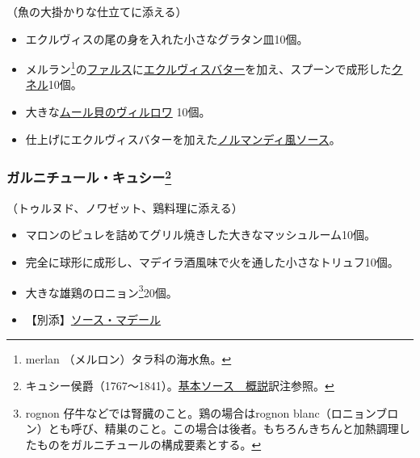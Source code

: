 \begin{recette}
（魚の大掛かりな仕立てに添える）

\begin{itemize}
\item
  エクルヴィスの尾の身を入れた小さなグラタン皿10個。
\item
  メルラン\footnote{merlan （メルロン）タラ科の海水魚。}の\protect\hyperlink{farce-a}{ファルス}に\protect\hyperlink{beurre-d-ecrevissse}{エクルヴィスバター}を加え、スプーンで成形した\protect\hyperlink{quenelles}{クネル}10個。
\item
  大きな\protect\hyperlink{moules-villeroy}{ムール貝のヴィルロワ} 10個。
\item
  仕上げにエクルヴィスバターを加えた\protect\hyperlink{sauce-normande}{ノルマンディ風ソース}。
\end{itemize}

\atoaki{}

\hypertarget{garniture-cussy}{%
\subsubsection[ガルニチュール・キュシー]{\texorpdfstring{ガルニチュール・キュシー\footnote{キュシー侯爵（1767〜1841）。\protect\hyperlink{osbservation-sur-la-sauce}{基本ソース　概説}訳注参照。}}{ガルニチュール・キュシー}}\label{garniture-cussy}}



（トゥルヌド、ノワゼット、鶏料理に添える）

\begin{itemize}
\item
  マロンのピュレを詰めてグリル焼きした大きなマッシュルーム10個。
\item
  完全に球形に成形し、マデイラ酒風味で火を通した小さなトリュフ10個。
\item
  大きな雄鶏のロニョン\footnote{rognon
    仔牛などでは腎臓のこと。鶏の場合はrognon
    blanc（ロニョンブロン）とも呼び、精巣のこと。この場合は後者。もちろんきちんと加熱調理したものをガルニチュールの構成要素とする。}20個。
\item
  【別添】\protect\hyperlink{sauce-madere}{ソース・マデール}
\end{itemize}


\end{recette}
